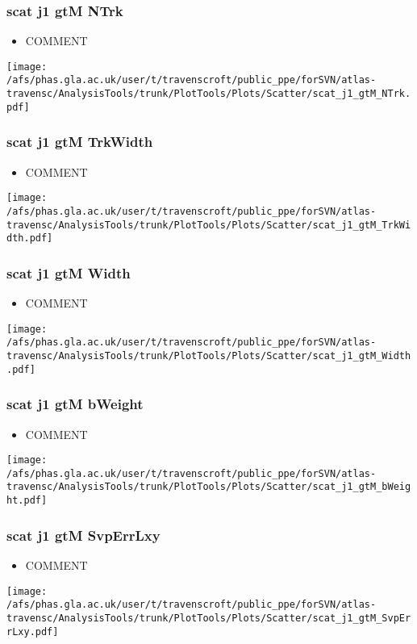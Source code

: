 \documentclass{beamer}
\begin{document}
\begin{frame}
\frametitle{scat j1 gtM NTrk}
\begin{itemize}
\item COMMENT
\end{itemize}
\begin{center}
\texttt{[image: /afs/phas.gla.ac.uk/user/t/travenscroft/public\_ppe/forSVN/atlas-travensc/AnalysisTools/trunk/PlotTools/Plots/Scatter/scat\_j1\_gtM\_NTrk.pdf]}
\end{center}
\end{frame}

\begin{frame}
\frametitle{scat j1 gtM TrkWidth}
\begin{itemize}
\item COMMENT
\end{itemize}
\begin{center}
\texttt{[image: /afs/phas.gla.ac.uk/user/t/travenscroft/public\_ppe/forSVN/atlas-travensc/AnalysisTools/trunk/PlotTools/Plots/Scatter/scat\_j1\_gtM\_TrkWidth.pdf]}
\end{center}
\end{frame}

\begin{frame}
\frametitle{scat j1 gtM Width}
\begin{itemize}
\item COMMENT
\end{itemize}
\begin{center}
\texttt{[image: /afs/phas.gla.ac.uk/user/t/travenscroft/public\_ppe/forSVN/atlas-travensc/AnalysisTools/trunk/PlotTools/Plots/Scatter/scat\_j1\_gtM\_Width.pdf]}
\end{center}
\end{frame}

\begin{frame}
\frametitle{scat j1 gtM bWeight}
\begin{itemize}
\item COMMENT
\end{itemize}
\begin{center}
\texttt{[image: /afs/phas.gla.ac.uk/user/t/travenscroft/public\_ppe/forSVN/atlas-travensc/AnalysisTools/trunk/PlotTools/Plots/Scatter/scat\_j1\_gtM\_bWeight.pdf]}
\end{center}
\end{frame}

\begin{frame}
\frametitle{scat j1 gtM SvpErrLxy}
\begin{itemize}
\item COMMENT
\end{itemize}
\begin{center}
\texttt{[image: /afs/phas.gla.ac.uk/user/t/travenscroft/public\_ppe/forSVN/atlas-travensc/AnalysisTools/trunk/PlotTools/Plots/Scatter/scat\_j1\_gtM\_SvpErrLxy.pdf]}
\end{center}
\end{frame}
\end{document}
